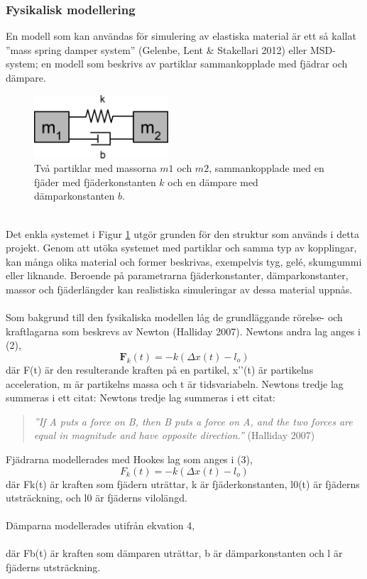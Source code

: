 \documentclass[a4paper,12pt,oneside,final,swedish]{extarticle}
\begin{document}
\subsubsection{Fysikalisk modellering}
En modell som kan användas för simulering av elastiska material är ett så kallat ''mass spring damper system'' (Gelenbe, Lent \& Stakellari 2012) eller MSD-system; en modell som beskrivs av partiklar sammankopplade med fjädrar och dämpare.\\
\begin{figure}[h!]
  \begin{center}
    \includegraphics[width=5cm]{Bilder/simple1D.png} 
  \end{center}
  \caption{Två partiklar med massorna $m1$ och $m2$, sammankopplade med en fjäder med fjäderkonstanten $k$ och en dämpare med dämparkonstanten $b$.}
  \label{m1m2}
\end{figure}
\\Det enkla systemet i Figur \ref{m1m2} utgör grunden för den struktur som används i detta projekt. Genom att utöka systemet med partiklar och samma typ av kopplingar, kan många olika material och former beskrivas, exempelvis tyg, gelé, skumgummi eller liknande. Beroende på parametrarna fjäderkonstanter, dämparkonstanter, massor och fjäderlängder kan realistiska simuleringar av dessa material uppnås.
\\\\Som bakgrund till den fysikaliska modellen låg de grundläggande rörelse- och kraftlagarna som beskrevs av Newton (Halliday 2007). Newtons andra lag anges i (2),
\begin{equation}
	{ \mathbf F }_{ k }(t)=-k(\Delta x(t)-{ l }_{ o })
\end{equation}
där F(t) är den resulterande kraften på en partikel, x’’(t) är partikelns acceleration, m är partikelns massa och t är tidsvariabeln. Newtons tredje lag summeras i ett citat:
Newtons tredje lag summeras i ett citat:
\begin{quote}\begin{center}\textit{''If A puts a force on B, then B puts a force on A, and the two forces are equal in magnitude and have opposite direction.''} (Halliday 2007)\end{center}\end{quote}
Fjädrarna modellerades med Hookes lag som anges i (3),
\begin{equation}
	{ F }_{ k }(t)=-k(\Delta x(t)-{ l }_{ o })
\end{equation}
där Fk(t) är kraften som fjädern uträttar, k är fjäderkonstanten, l0(t) är fjäderns utsträckning, och l0 är fjäderns vilolängd.
\\\\Dämparna modellerades utifrån ekvation 4,
\\%
\\där Fb(t) är kraften som dämparen uträttar, b är dämparkonstanten och l är fjäderns utsträckning.
\end{document}

